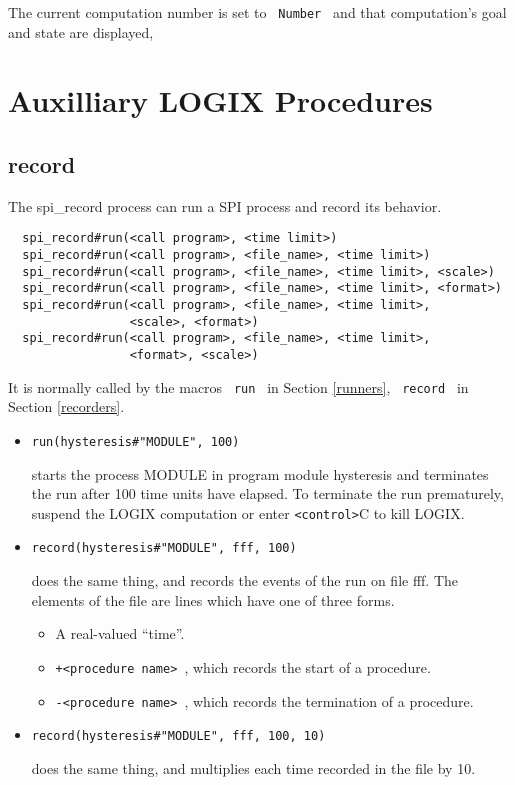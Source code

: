 The current computation number is set to \verb+ Number + and
that computation's goal and state are displayed,

\chapter{Auxilliary LOGIX Procedures}
\label{auxilliary}

\section{record}
\label{record}

The spi\_record process can run a SPI process
and record its behavior.

\begin{verbatim}
  spi_record#run(<call program>, <time limit>)
  spi_record#run(<call program>, <file_name>, <time limit>)
  spi_record#run(<call program>, <file_name>, <time limit>, <scale>)
  spi_record#run(<call program>, <file_name>, <time limit>, <format>)
  spi_record#run(<call program>, <file_name>, <time limit>,
                 <scale>, <format>)
  spi_record#run(<call program>, <file_name>, <time limit>,
                 <format>, <scale>)
\end{verbatim}

\noindent
It is normally called by the macros \verb+ run + in Section
\ref{runners}, \verb+ record + in Section \ref{recorders}.

\begin{itemize}
\item
  \verb+run(hysteresis#"MODULE", 100)+

\noindent
starts the process  MODULE  in program module  hysteresis  and
terminates the run after 100 time units have elapsed.  To 
terminate the run prematurely, suspend the LOGIX computation
or enter  \verb+<control>+C  to kill LOGIX.

\item
  \verb+record(hysteresis#"MODULE", fff, 100)+

\noindent
does the same thing, and records the events of the run on file fff.
The elements of the file are lines which have one of three forms.
\begin{itemize}
\item
A real-valued ``time''.
\item
\verb:+<procedure name> :, which records the start of a procedure.
\item
\verb:-<procedure name> :, which records the termination of a procedure.
\end{itemize}

\item
  \verb+record(hysteresis#"MODULE", fff, 100, 10)+

\noindent
does the same thing, and multiplies each time recorded in the file
by 10.
\end{itemize}

